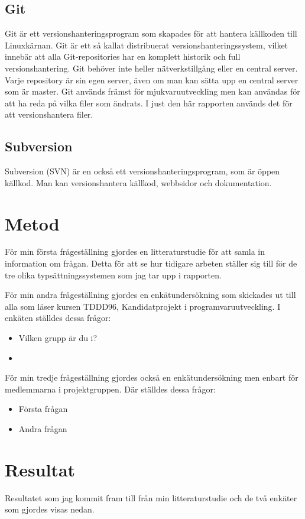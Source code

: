 \subsection{Git}
Git är ett versionshanteringsprogram som skapades för att hantera källkoden till Linuxkärnan. Git är ett så kallat distribuerat versionshanteringssystem, vilket innebär att alla Git-repositories har en komplett historik och full versionshantering. Git behöver inte heller nätverkstillgång eller en central server. Varje repository är sin egen server, även om man kan sätta upp en central server som är master. Git används främst för mjukvaruutveckling men kan användas för att ha reda på vilka filer som ändrats. I just den här rapporten används det för att versionshantera \latex filer.

\subsection{Subversion}
Subversion (SVN) är en också ett versionshanteringsprogram, som är öppen källkod. Man kan versionshantera källkod, webbsidor och dokumentation. 

\section{Metod}
\label{sec:method-tuhkala}

För min första frågeställning gjordes en litteraturstudie för att samla in information om frågan. Detta för att se hur tidigare arbeten ställer sig till för de tre olika typsättningssystemen som jag tar upp i rapporten.

För min andra frågeställning gjordes en enkätundersökning som skickades ut till alla som läser kursen TDDD96, Kandidatprojekt i programvaruutveckling. I enkäten ställdes dessa frågor:
\begin{itemize}
	\item Vilken grupp är du i?
	\item 
\end{itemize}

För min tredje frågeställning gjordes också en enkätundersökning men enbart för medlemmarna i projektgruppen. Där ställdes dessa frågor:
\begin{itemize}
	\item Första frågan
	\item Andra frågan
\end{itemize}

\section{Resultat}
\label{sec:results-tuhkala}
Resultatet som jag kommit fram till från min litteraturstudie och de två enkäter som gjordes visas nedan.

